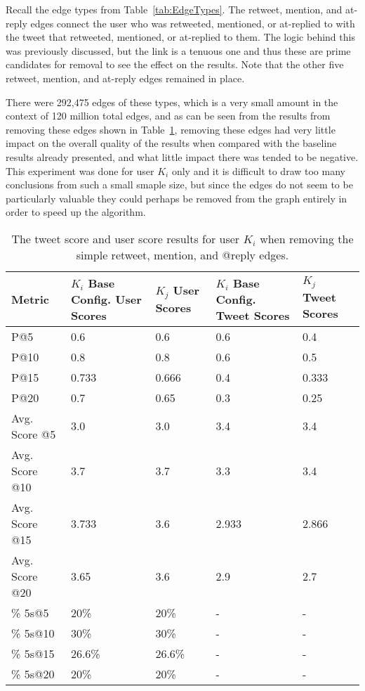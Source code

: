 Recall the edge types from Table~\ref{tab:EdgeTypes}. The retweet, mention, and at-reply edges connect the user who was retweeted, mentioned, or at-replied to with the tweet that retweeted, mentioned, or at-replied to them. The logic behind this was previously discussed, but the link is a tenuous one and thus these are prime candidates for removal to see the effect on the results. Note that the other five retweet, mention, and at-reply edges remained in place.

There were 292,475 edges of these types, which is a very small amount in the context of 120 million total edges, and as can be seen from the results from removing these edges shown in Table~\ref{tab:Remove369}, removing these edges had very little impact on the overall quality of the results when compared with the baseline results already presented, and what little impact there was tended to be negative. This experiment was done for user $K_{i}$ only and it is difficult to draw too many conclusions from such a small smaple size, but since the edges do not seem to be particularly valuable they could perhaps be removed from the graph entirely in order to speed up the algorithm.


\begin{table}
\centering
\begin{tabular}{l|p{2cm}|p{2cm}|p{2cm}|p{2cm}}
{\bf Metric} & {\bf $K_{i}$ Base Config. User Scores} & {\bf $K_{j}$ User Scores} & {\bf $K_{i}$ Base Config. Tweet Scores} & {\bf $K_{j}$ Tweet Scores} \\ \hline
P@5   & 0.6 & 0.6 & 0.6 & 0.4 \\ \hline
P@10 & 0.8 & 0.8 & 0.6 & 0.5 \\ \hline
P@15 & 0.733 & 0.666 & 0.4 & 0.333 \\ \hline
P@20 & 0.7 & 0.65 & 0.3 & 0.25 \\ \hline

Avg. Score @5   & 3.0 & 3.0 & 3.4 & 3.4 \\ \hline
Avg. Score @10 & 3.7 & 3.7 & 3.3 & 3.4 \\ \hline
Avg. Score @15 & 3.733 & 3.6 & 2.933 & 2.866 \\ \hline
Avg. Score @20 & 3.65 & 3.6 & 2.9 & 2.7 \\ \hline

\% 5s@5    & 20\% & 20\% & - & - \\ \hline
\% 5s@10  & 30\% & 30\% & - & - \\ \hline
\% 5s@15  & 26.6\% & 26.6\% & - & - \\ \hline
\% 5s@20  & 20\% & 20\% & - & - \\

\end{tabular}
\caption{The tweet score and user score results for user $K_{i}$ when removing the simple retweet, mention, and @reply edges.}
\label{tab:Remove369}
\end{table}



